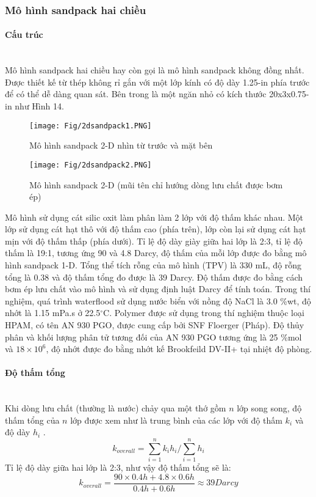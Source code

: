 \documentclass[12pt,a4paper]{article}
\newcommand{\subsubsubsection}[1]{\paragraph{#1}\mbox{}\\}
\begin{document}
	\subsubsection{Mô hình sandpack hai chiều}
	\subsubsubsection{Cấu trúc}
	Mô hình sandpack hai chiều hay còn gọi là mô hình sandpack không đồng nhất. Được thiết kế từ thép không rỉ gắn với một lớp kính có độ dày 1.25-in phía trước để có thể dễ dàng quan sát. Bên trong là một ngăn nhỏ có kích thước 20x3x0.75-in như Hình 14.
		\begin{figure}[h]
			\centering
			\texttt{[image: Fig/2dsandpack1.PNG]}
			\caption{Mô hình sandpack 2-D nhìn từ trước và mặt bên \cite{li2011study}}
		\end{figure}
		\begin{figure}[h]
			\centering
			\texttt{[image: Fig/2dsandpack2.PNG]}
			\caption{Mô hình sandpack 2-D (mũi tên chỉ hướng dòng lưu chất được bơm ép) \cite{li2011study}}
		\end{figure}
	\newline
	Mô hình sử dụng cát silic oxit làm phân làm 2 lớp với độ thấm khác nhau. Một lớp sử dụng cát hạt thô với độ thấm cao (phía trên), lớp còn lại sử dụng cát hạt mịn với độ thấm thấp (phía dưới). Tỉ lệ độ dày giày giữa hai lớp là 2:3, tỉ lệ độ thấm là 19:1, tương ứng 90 và 4.8 Darcy, độ thấm của mỗi lớp được đo bằng mô hình sandpack 1-D. Tổng thể tích rỗng của mô hình (TPV) là 330 mL, độ rỗng tổng là 0.38 và độ thấm tổng đo được là 39 Darcy. Độ thấm được đo bằng cách bơm ép lưu chất vào mô hình và sử dụng định luật Darcy để tính toán. Trong thí nghiệm, quá trình waterflood sử dụng nước biển với nồng độ NaCl là 3.0 \%wt, độ nhớt là 1.15 mPa.s ở 22.5$^{\circ}$C. Polymer được sử dụng trong thí nghiệm thuộc loại HPAM, có tên AN 930 PGO, được cung cấp bởi SNF Floerger (Pháp). Độ thủy phân và khối lượng phân tử tương đối của AN 930 PGO tương ứng là 25 \%mol và $18\times10^6$, độ nhớt được đo bằng nhớt kế Brookfeild DV-II+ tại nhiệt độ phòng.
	\subsubsubsection{Độ thấm tổng}
	Khi dòng lưu chất (thường là nước) chảy qua một thớ gồm $n$ lớp song song, độ thấm tổng của $n$ lớp được xem như là trung bình của các lớp với độ thấm $k_i$ và độ dày $h_i$ \cite{li2011study}.
		\begin{equation}
			k_{overall}=\sum_{i=1}^nk_ih_i/\sum_{i=1}^nh_i
		\end{equation}
	Tỉ lệ độ dày giữa hai lớp là 2:3, như vậy độ thấm tổng sẽ là:
		\begin{equation}
			k_{overall}=\frac{90\times0.4h+4.8\times0.6h}{0.4h+0.6h}\approx39 Darcy
		\end{equation}
\newpage
\end{document}
